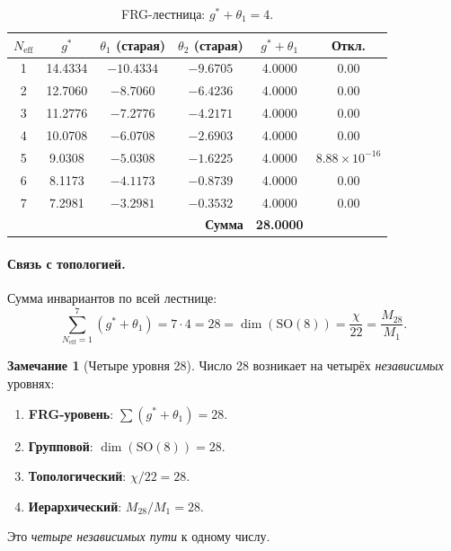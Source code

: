 \documentclass[11pt,a4paper]{article}
\newcommand{\SO}{\mathrm{SO}}
\theoremstyle{definition}
\newtheorem{remark}[theorem]{Замечание}
\begin{document}
\begin{table}[htbp]
\centering
\caption{FRG-лестница: $g^* + \theta_1 = 4$.}
\label{tab:frg-ladder-review}
\begin{tabular}{cccccc}
\toprule
$N_{\text{eff}}$ & $g^*$ & $\theta_1$ (старая) & $\theta_2$ (старая) 
& $g^* + \theta_1$ & Откл. \\
\midrule
1 & 14.4334 & $-10.4334$ & $-9.6705$ & 4.0000 & $0.00$ \\
2 & 12.7060 & $-8.7060$  & $-6.4236$ & 4.0000 & $0.00$ \\
3 & 11.2776 & $-7.2776$  & $-4.2171$ & 4.0000 & $0.00$ \\
4 & 10.0708 & $-6.0708$  & $-2.6903$ & 4.0000 & $0.00$ \\
5 & 9.0308  & $-5.0308$  & $-1.6225$ & 4.0000 & $8.88 \times 10^{-16}$ \\
6 & 8.1173  & $-4.1173$  & $-0.8739$ & 4.0000 & $0.00$ \\
7 & 7.2981  & $-3.2981$  & $-0.3532$ & 4.0000 & $0.00$ \\
\midrule
\multicolumn{4}{r}{\textbf{Сумма}} & \textbf{28.0000} & \\
\bottomrule
\end{tabular}
\end{table}

\paragraph{Связь с топологией.}
Сумма инвариантов по всей лестнице:
\begin{equation}
    \boxed{
    \sum_{N_{\text{eff}}=1}^{7} (g^* + \theta_1) = 7 \cdot 4 = 28
    = \dim(\SO(8)) = \frac{\chi}{22} = \frac{M_{28}}{M_1}.
    }
    \label{eq:frg-sum-28-review}
\end{equation}

\begin{remark}[Четыре уровня 28]
\label{rem:four-28-review}
Число 28 возникает на четырёх \emph{независимых} уровнях:
\begin{enumerate}
    \item \textbf{FRG-уровень}: $\sum(g^* + \theta_1) = 28$.
    \item \textbf{Групповой}: $\dim(\SO(8)) = 28$.
    \item \textbf{Топологический}: $\chi/22 = 28$.
    \item \textbf{Иерархический}: $M_{28}/M_1 = 28$.
\end{enumerate}
Это \emph{четыре независимых пути} к одному числу.
\end{remark}
\end{document}
